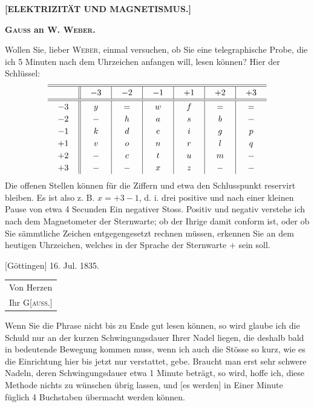 \clearpage\begingroup
{}\NoSourceHead
\begin{center}
\textbf{\Large [ELEKTRIZITÄT UND MAGNETISMUS.]}\par\bigskip
\textbf{\large{}}\par\bigskip
[1.]\par\medskip
\textbf{\textsc{Gauss} an \textsc{W. Weber}.}
\end{center}
\noindent\hspace*{\parindent}Wollen Sie, lieber \textsc{Weber}, einmal versuchen, ob Sie eine telegraphische Probe, die ich 5 Minuten nach dem Uhrzeichen anfangen will, lesen können? Hier der Schlüssel:
\[
\renewcommand{\arraystretch}{1.2}\setlength{\arraycolsep}{12pt}
\begin{array}{c||c|c|c|c|c|c}
\hline\hline
{}&-3&-2&-1&+1&+2&+3\\
\hline\hline
-3&y&=&w&f&=&=\\
-2&-&h&a&s&b&-\\
-1&k&d&e&i&g&p\\
+1&v&o&n&r&l&q\\
+2&-&c&t&u&m&-\\
+3&-&-&x&z&-&-
\end{array}
\]
\noindent Die offenen Stellen können für die Ziffern und etwa den Schlusspunkt reservirt bleiben. Es ist also z. B. $x=+3-1$, d. i. drei positive und nach einer kleinen Pause von etwa 4 Secunden Ein negativer Stoss. Positiv und negativ verstehe ich nach dem Magnetometer der Sternwarte; ob der Ihrige damit conform ist, oder ob Sie sämmtliche Zeichen entgegengesetzt rechnen müssen, erkennen Sie an dem heutigen Uhrzeichen, welches in der Sprache der Sternwarte $+$ sein soll.
\par\medskip
\noindent\hspace*{\parindent}[Göttingen] 16. Jul. 1835.\hfill\begin{tabular}[t]{@{}l@{}}Von Herzen\\\hspace*{4em}Ihr G[\textsc{auss}.]\end{tabular}\hspace*{\parindent}
\clearpage{}
\noindent\hspace*{\parindent}Wenn Sie die Phrase nicht bis zu Ende gut lesen können, so wird glaube ich die Schuld nur an der kurzen Schwingungsdauer Ihrer Nadel liegen, die deshalb bald in bedeutende Bewegung kommen muss, wenn ich auch die Stösse so kurz, wie es die Einrichtung hier bis jetzt nur verstattet, gebe. Braucht man erst sehr schwere Nadeln, deren Schwingungsdauer etwa 1 Minute beträgt, so wird, hoffe ich, diese Methode nichts zu wünschen übrig lassen, und [es werden] in Einer Minute füglich 4 Buchstaben übermacht werden können.
\clearpage\endgroup
